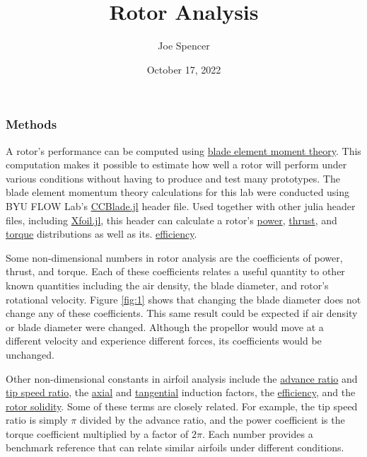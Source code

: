 \documentclass{article}
\begin{document}
\author{Joe Spencer}
\title{Rotor Analysis}
\date{October 17, 2022}
\maketitle

\subsubsection*{Methods}

A rotor's performance can be computed using  \hyperlink{BEM}{blade element moment theory}. This computation makes it possible to estimate how well a rotor will perform under various conditions without having to produce and test many prototypes. The blade element momentum theory calculations for this lab were conducted using BYU FLOW Lab's \href{https://flow.byu.edu/CCBlade.jl/stable/}{CCBlade.jl} header file. Used together with other julia header files, including \href{https://flow.byu.edu/Xfoil.jl/dev/}{Xfoil.jl}, this header can calculate a rotor's \hyperlink{CP}{power}, \hyperlink{CT}{thrust}, and \hyperlink{CQ}{torque} distributions as well as its. \hyperlink{eta}{efficiency}. \newline

Some non-dimensional numbers in rotor analysis are the coefficients of power, thrust, and torque. Each of these coefficients relates a useful quantity to other known quantities including the air density, the blade diameter, and rotor's rotational velocity. Figure \ref{fig:1} shows that changing the blade diameter does not change any of these coefficients. This same result could be expected if air density or blade diameter were changed. Although the propellor would move at a different velocity and experience different forces, its coefficients would be unchanged. \newline

Other non-dimensional constants in airfoil analysis include the \hyperlink{J}{advance ratio} and \hyperlink{lambda}{tip speed ratio}, the \hyperlink{a}{axial} and \hyperlink{a'}{tangential} induction factors, the \hyperlink{eta}{efficiency}, and the \hyperlink{sigma}{rotor solidity}. Some of these terms are closely related. For example, the tip speed ratio is simply $\pi$ divided by the advance ratio, and the power coefficient is the torque coefficient multiplied by a factor of $2 \pi$. Each number provides a benchmark reference that can relate similar airfoils under different conditions. \newline 
\end{document}
